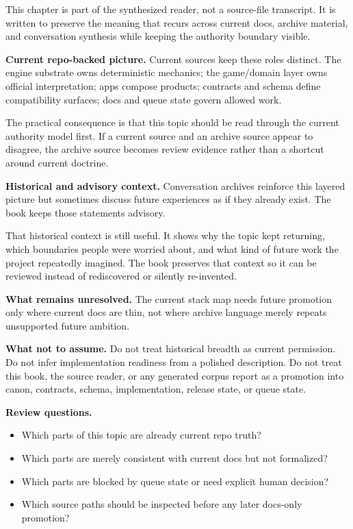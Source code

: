 \documentclass[10.5pt,a4paper,openany]{book}
\begin{document}
This chapter is part of the synthesized reader, not a source-\allowbreak{}file transcript.\allowbreak{} It is written to preserve the meaning that recurs across current docs, archive material, and conversation synthesis while keeping the authority boundary visible.\allowbreak{}


\textbf{Current repo-backed picture.} Current sources keep these roles distinct.\allowbreak{} The engine substrate owns deterministic mechanics; the game/\allowbreak{}domain layer owns official interpretation; apps compose products; contracts and schema define compatibility surfaces; docs and queue state govern allowed work.\allowbreak{}


The practical consequence is that this topic should be read through the current authority model first.\allowbreak{} If a current source and an archive source appear to disagree, the archive source becomes review evidence rather than a shortcut around current doctrine.\allowbreak{}


\textbf{Historical and advisory context.} Conversation archives reinforce this layered picture but sometimes discuss future experiences as if they already exist.\allowbreak{} The book keeps those statements advisory.\allowbreak{}


That historical context is still useful.\allowbreak{} It shows why the topic kept returning, which boundaries people were worried about, and what kind of future work the project repeatedly imagined.\allowbreak{} The book preserves that context so it can be reviewed instead of rediscovered or silently re-\allowbreak{}invented.\allowbreak{}


\textbf{What remains unresolved.} The current stack map needs future promotion only where current docs are thin, not where archive language merely repeats unsupported future ambition.\allowbreak{}


\textbf{What not to assume.} Do not treat historical breadth as current permission.\allowbreak{} Do not infer implementation readiness from a polished description.\allowbreak{} Do not treat this book, the source reader, or any generated corpus report as a promotion into canon, contracts, schema, implementation, release state, or queue state.\allowbreak{}


\textbf{Review questions.}


\begin{itemize}
\item Which parts of this topic are already current repo truth?
\item Which parts are merely consistent with current docs but not formalized?
\item Which parts are blocked by queue state or need explicit human decision?
\item Which source paths should be inspected before any later docs-\allowbreak{}only promotion?
\end{itemize}
\end{document}
